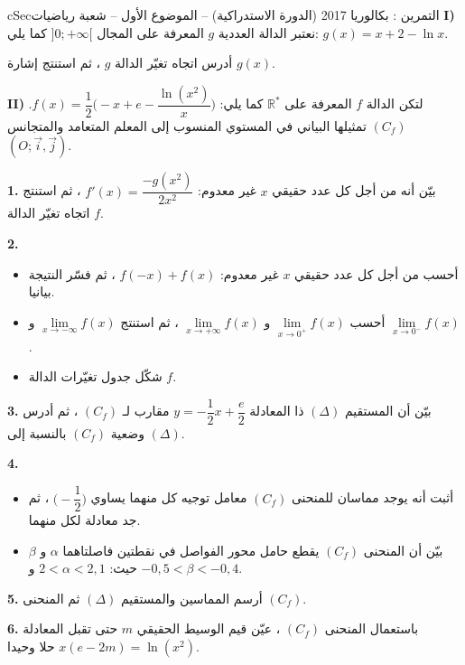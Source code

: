 \documentclass[12pt,a4paper]{article}
\newenvironment{BOX}[2]{\begin{otherlanguage}{english}\begin{arbox}{#1}{#2}}{\end{arbox}\end{otherlanguage}}
\newcounter{exo}
\newenvironment{tamrin}[1]{\stepcounter{exo}\begin{BOX}{cSec}{التمرين \theexo: #1}}{\end{BOX}}
\newcommand{\R}{\mathbb{R}}
\newenvironment{sq}{\begin{itemize}[leftmargin=2.4em,itemsep=3pt]}{\end{itemize}}
\newcommand{\qa}{\item[(أ)]}\newcommand{\qb}{\item[(ب)]}\newcommand{\qc}{\item[(جـ)]}\newcommand{\qd}{\item[(د)]}\newcommand{\qe}{\item[(هـ)]}
\newcommand{\QQ}[1]{\par\smallskip\textbf{#1.} }
\begin{document}
\begin{tamrin}{بكالوريا 2017 (الدورة الاستدراكية) -- الموضوع الأول -- شعبة رياضيات}
\textbf{I)} نعتبر الدالة العددية $g$ المعرفة على المجال $]0;+\infty[$ كما يلي: $g(x)=x+2-\ln x$.

أدرس اتجاه تغيّر الدالة $g$ ، ثم استنتج إشارة $g(x)$.

\textbf{II)} لتكن الدالة $f$ المعرفة على $\R^{*}$ كما يلي: $f(x)=\dfrac12\Big(-x+e-\dfrac{\ln(x^2)}{x}\Big)$.
$(C_f)$ تمثيلها البياني في المستوي المنسوب إلى المعلم المتعامد والمتجانس $(O;\vec i,\vec j)$.
\QQ{1} بيّن أنه من أجل كل عدد حقيقي $x$ غير معدوم: $f'(x)=\dfrac{-g(x^2)}{2x^2}$ ، ثم استنتج اتجاه تغيّر الدالة $f$.
\QQ{2}
\begin{sq}
\qa أحسب من أجل كل عدد حقيقي $x$ غير معدوم: $f(-x)+f(x)$ ، ثم فسّر النتيجة بيانيا.
\qb أحسب $\lim\limits_{x\to0^{+}}f(x)$ و $\lim\limits_{x\to+\infty}f(x)$ ، ثم استنتج $\lim\limits_{x\to-\infty}f(x)$ و $\lim\limits_{x\to0^{-}}f(x)$.
\qc شكّل جدول تغيّرات الدالة $f$.
\end{sq}
\QQ{3} بيّن أن المستقيم $(\Delta)$ ذا المعادلة $y=-\dfrac12x+\dfrac e2$ مقارب لـ $(C_f)$ ، ثم أدرس وضعية $(C_f)$ بالنسبة إلى $(\Delta)$.
\QQ{4}
\begin{sq}
\qa أثبت أنه يوجد مماسان للمنحنى $(C_f)$ معامل توجيه كل منهما يساوي $\Big(-\dfrac12\Big)$ ، ثم جد معادلة لكل منهما.
\qb بيّن أن المنحنى $(C_f)$ يقطع حامل محور الفواصل في نقطتين فاصلتاهما $\alpha$ و $\beta$ حيث: $2<\alpha<2{,}1$ و $-0{,}5<\beta<-0{,}4$.
\end{sq}
\QQ{5} أرسم المماسين والمستقيم $(\Delta)$ ثم المنحنى $(C_f)$.
\QQ{6} باستعمال المنحنى $(C_f)$ ، عيّن قيم الوسيط الحقيقي $m$ حتى تقبل المعادلة $x(e-2m)=\ln(x^2)$ حلا وحيدا.
\end{tamrin}
\end{document}

